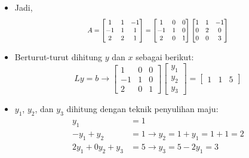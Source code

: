 \documentclass[pdflatex,compress,mathserif]{beamer}
\newcommand*{\Scale}[2][4]{\scalebox{#1}{$#2$}}%
\begin{document}
\begin{frame}
	\begin{itemize}
		\item Jadi,
		\[\Scale[0.8]{ A = 
		\begin{bmatrix}
			1 & 1 & -1 \\
			-1 & 1 & 1 \\
			2 & 2 & 1
		\end{bmatrix} = 
		\begin{bmatrix}
			1 & 0 & 0 \\
			-1 & 1 & 0 \\
			2 & 0 & 1
		\end{bmatrix}
		\begin{bmatrix}
			1 & 1 & -1\\
			0 & 2 & 0 \\
			0 & 0 & 3
		\end{bmatrix}
		}\]
		\item Berturut-turut dihitung $ y $ dan $ x $ sebagai berikut:
		\[ Ly = b \rightarrow \begin{bmatrix}
		1 & 0 & 0\\
		-1 & 1 & 0\\
		2 & 0 & 1
		\end{bmatrix}
		\begin{bmatrix}
			y_1 \\ y_2 \\ y_3
		\end{bmatrix} = 
		\begin{bmatrix}
			1 & 1 & 5
		\end{bmatrix}\]
		\item $ y_1 $, $ y_2 $, dan $ y_3 $ dihitung dengan teknik penyulihan maju:
		\begin{align*}
			y_1 &= 1\\
			-y_1 + y_2 &= 1 \rightarrow y_2 = 1 + y_1 = 1 + 1 = 2 \\
			2y_1 + 0y_2 + y_3 &= 5 \rightarrow y_3 = 5 - 2y_1 = 3
		\end{align*}
	\end{itemize}
\end{frame}
\end{document}
